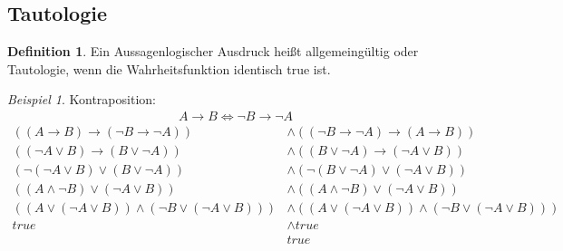 \documentclass[12pt,a4paper,titlepage]{article} %
\theoremstyle{definition}
\newtheorem{defi}[satz]{Definition}
\theoremstyle{remark}
\newtheorem*{bsp}{Beispiel}
\begin{document}
	\subsection{Tautologie}
	\begin{defi}
		Ein Aussagenlogischer Ausdruck heißt allgemeingültig oder Tautologie, wenn die Wahrheitsfunktion identisch true ist.
	\end{defi}	
	\begin{bsp}
		Kontraposition:\\
		\begin{align*}
			A \rightarrow B \Leftrightarrow \neg B \rightarrow \neg A
		\end{align*}
		\begin{align*}
			((A \rightarrow B) \rightarrow (\neg B \rightarrow \neg A)) &\wedge ((\neg B \rightarrow \neg A) \rightarrow (A \rightarrow B))\\
			((\neg A \vee B) \rightarrow (B \vee \neg A)) &\wedge ((B \vee \neg A) \rightarrow (\neg A \vee B))\\
			(\neg (\neg A \vee B) \vee (B \vee \neg A)) &\wedge (\neg (B \vee \neg A) \vee (\neg A \vee B))\\
			((A \wedge \neg B) \vee (\neg A \vee B)) &\wedge ((A \wedge \neg B) \vee (\neg A \vee B))\\
			((A \vee (\neg A \vee B)) \wedge (\neg B \vee (\neg A \vee B))) &\wedge ((A \vee (\neg A \vee B)) \wedge (\neg B \vee (\neg A \vee B)))\\
			true &\wedge true\\
			&true
		\end{align*}
	\end{bsp}
\end{document}
